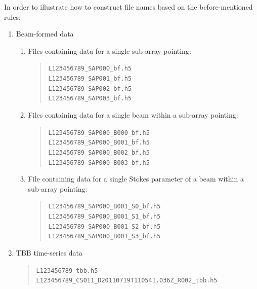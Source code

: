 \documentclass[a4paper,10pt,bibtotoc]{scrartcl}
\begin{document}
In order to illustrate how to construct file names based on the
before-mentioned rules:
\begin{enumerate}
\item Beam-formed data
  \begin{enumerate}
  \item Files containing data for a single sub-array pointing:
    \begin{verse}
      \verb|L123456789_SAP000_bf.h5| \\
      \verb|L123456789_SAP001_bf.h5| \\
      \verb|L123456789_SAP002_bf.h5| \\
      \verb|L123456789_SAP003_bf.h5|
   \end{verse}
  \item Files containing data for a single beam within a sub-array pointing:
    \begin{verse}
      \verb|L123456789_SAP000_B000_bf.h5| \\
      \verb|L123456789_SAP000_B001_bf.h5| \\
      \verb|L123456789_SAP000_B002_bf.h5| \\
      \verb|L123456789_SAP000_B003_bf.h5|
   \end{verse}
  \item File containing data for a single Stokes parameter of a beam
    within a sub-array pointing:
    \begin{verse}
      \verb|L123456789_SAP000_B001_S0_bf.h5| \\
      \verb|L123456789_SAP000_B001_S1_bf.h5| \\
      \verb|L123456789_SAP000_B001_S2_bf.h5| \\
      \verb|L123456789_SAP000_B001_S3_bf.h5|
   \end{verse}
\end{enumerate}
\item TBB time-series data
  \begin{verse}
      \verb|L123456789_tbb.h5|   \\
      \verb|L123456789_CS011_D20110719T110541.036Z_R002_tbb.h5|
  \end{verse}
\end{enumerate}



\clearpage
\appendix
\end{document}
